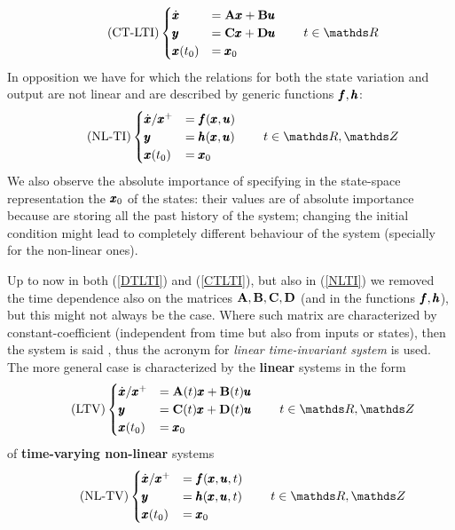 	\begin{equation} \tag{CT-LTI} \label{CTLTI}
		\begin{cases}
			\dx & = \A \x + \B \u \\ \y & = \C \x + \D \u \\ \x(t_0) & = \x_0 
		\end{cases} \qquad t \in \mathds R
	\end{equation}
	In opposition we have  for which the relations for both the state variation and output are not linear and are described by generic functions $\pmb{f}, \pmb{h}$:
	\begin{equation} \tag{NL-TI} \label{NLTI}
		\begin{cases}
			\dx/\xp & = \vet f(\x, \u) \\ \y & = \vet h (\x, \u) \\ \x(t_0) & = \x_0 
		\end{cases} \qquad t\in \mathds R,\mathds Z
	\end{equation}
	We also observe the absolute importance of specifying in the state-space representation the  $\pmb{x}_0$ of the states: their values are of absolute importance because are storing all the past history of the system; changing the initial condition might lead to completely different behaviour of the system (specially for the non-linear ones).
	
	\vspace{3mm}
	Up to now in both (\ref{DTLTI}) and (\ref{CTLTI}), but also in (\ref{NLTI}) we removed the time dependence also on the matrices $\mathbf{A},\mathbf{B},\mathbf{C},\mathbf{D}$ (and in the functions $\pmb{f}, \pmb{h}$), but this might not always be the case. Where such matrix are characterized by constant-coefficient (independent from time but also from inputs or states), then the system is said , thus the acronym  for \textit{linear time-invariant system} is used. The more general case is characterized by the  \textbf{linear} systems in the form
	\begin{equation} \tag{LTV} \label{LTV}
		\begin{cases}
			\dx/\xp & = \A(t) \x + \B(t) \u \\ \y & = \C(t) \x + \D(t) \u \\ \x(t_0) & = \x_0 
		\end{cases} \qquad t \in \mathds R,\mathds Z
	\end{equation}
	of \textbf{time-varying non-linear} systems
	\begin{equation} \tag{NL-TV} \label{NLTV}
		\begin{cases}
			\dx/\xp & = \vet f(\x, \u, t) \\ \y & = \vet h (\x, \u, t) \\ \x(t_0) & = \x_0 
		\end{cases} \qquad t\in \mathds R,\mathds Z
	\end{equation}
	
